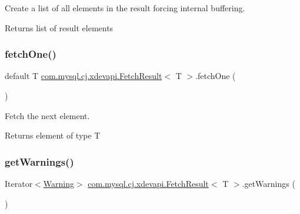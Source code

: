 Create a list of all elements in the result forcing internal buffering.

\begin{DoxyReturn}{Returns}
list of result elements 
\end{DoxyReturn}
\mbox{\label{interfacecom_1_1mysql_1_1cj_1_1xdevapi_1_1_fetch_result_ad5e5532da2f3d92187cfdfb6a1c5f3db}} 
\subsubsection{\texorpdfstring{fetch\+One()}{fetchOne()}}
{\footnotesize\ttfamily default T \mbox{\hyperlink{interfacecom_1_1mysql_1_1cj_1_1xdevapi_1_1_fetch_result}{com.\+mysql.\+cj.\+xdevapi.\+Fetch\+Result}}$<$ T $>$.fetch\+One (\begin{DoxyParamCaption}{ }\end{DoxyParamCaption})}

Fetch the next element.

\begin{DoxyReturn}{Returns}
element of type T 
\end{DoxyReturn}
\mbox{\label{interfacecom_1_1mysql_1_1cj_1_1xdevapi_1_1_fetch_result_ae7e96688f6f01a6c8a932dadf65a6daf}} 
\subsubsection{\texorpdfstring{get\+Warnings()}{getWarnings()}}
{\footnotesize\ttfamily Iterator$<$\mbox{\hyperlink{interfacecom_1_1mysql_1_1cj_1_1protocol_1_1_warning}{Warning}}$>$ \mbox{\hyperlink{interfacecom_1_1mysql_1_1cj_1_1xdevapi_1_1_fetch_result}{com.\+mysql.\+cj.\+xdevapi.\+Fetch\+Result}}$<$ T $>$.get\+Warnings (\begin{DoxyParamCaption}{ }\end{DoxyParamCaption})}

